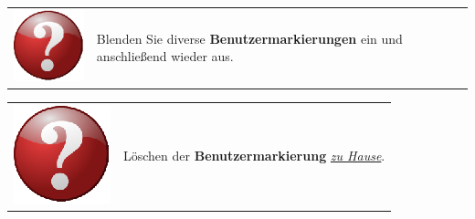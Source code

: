 \documentclass[10pt]{scrreprt}
\begin{document}
\vspace{3mm}
\begin{figure}[!htb]
	\centering
    \hspace{5mm}
\end{figure}


\vspace{3mm}
\begin{tabular}{>{\centering \arraybackslash}m{1cm} m{14cm}}
\includegraphics[scale=0.5]{images/quest.eps} & Blenden Sie diverse \textbf{Benutzermarkierungen} ein und anschließend wieder aus.
\end{tabular}

\vspace{3mm}
\begin{tabular}{>{\centering \arraybackslash}m{1cm} m{14cm}}
\includegraphics[scale=0.5]{images/quest.eps} & Löschen der \textbf{Benutzermarkierung} \underline{\textit{zu Hause}}.
\end{tabular}
\end{document}
